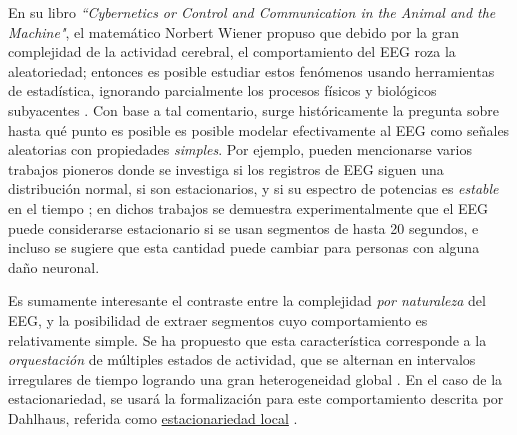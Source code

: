 \documentclass[12pt,letterpaper]{book}
\begin{document}
%
En su libro \textit{``Cybernetics or Control and Communication in the Animal and the Machine"}, el matemático Norbert Wiener 
propuso que 
debido por la gran complejidad de la actividad cerebral, el comportamiento del EEG roza la aleatoriedad; entonces es posible estudiar estos fenómenos usando herramientas de estadística, ignorando parcialmente los procesos físicos y biológicos subyacentes
\cite{wiener61}.
%
Con base a tal comentario, surge históricamente la pregunta sobre hasta qué punto es posible es posible modelar efectivamente al EEG como señales aleatorias con propiedades \textit{simples}.
%
Por ejemplo, pueden mencionarse varios trabajos pioneros donde se investiga si los registros de EEG siguen una distribución normal, si son estacionarios, y si su espectro de potencias es \textit{estable} en el tiempo
\cite{Kawabata73,McEwen75,Sugimoto78,Cohen77};
en dichos trabajos se demuestra experimentalmente que el EEG puede considerarse estacionario si se usan segmentos de hasta 20 segundos, e incluso se sugiere que esta cantidad puede cambiar para personas con alguna daño neuronal.

Es sumamente interesante el contraste entre la complejidad \textit{por naturaleza} del EEG, y la posibilidad de extraer segmentos cuyo comportamiento es relativamente simple.
%
Se ha propuesto que esta característica corresponde a la \textit{orquestación} de múltiples estados de actividad, que se alternan en intervalos irregulares de tiempo logrando una gran heterogeneidad global \cite{kaplan2000application}.
%
En el caso de la estacionariedad, se usará la formalización para este comportamiento descrita por Dahlhaus, referida como \underline{estacionariedad local} \cite{Dahlhaus97}.
\end{document}
